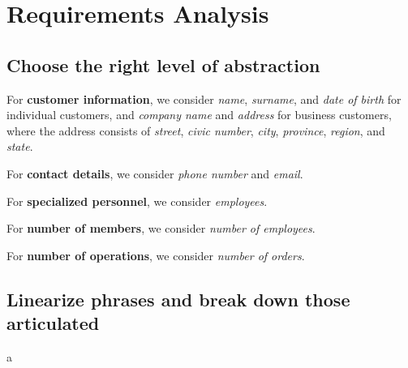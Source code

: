 

\newpage
\chapter{Requirements Analysis}

\section{Choose the right level of abstraction}
For \textbf{customer information}, we consider \textit{name}, \textit{surname}, and \textit{date of birth} for individual customers, and \textit{company name} and \textit{address} for business customers, where the address consists of \textit{street}, \textit{civic number}, \textit{city}, \textit{province}, \textit{region}, and \textit{state}.  

For \textbf{contact details}, we consider \textit{phone number} and \textit{email}.  

For \textbf{specialized personnel}, we consider \textit{employees}.  

For \textbf{number of members}, we consider \textit{number of employees}.  

For \textbf{number of operations}, we consider \textit{number of orders}.

\section{Linearize phrases and break down those articulated}
a
